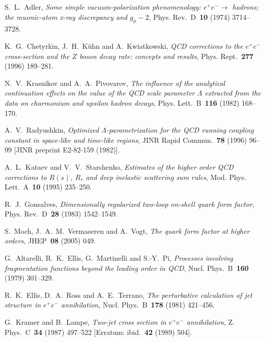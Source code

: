 S.~L.~Adler, \emph{Some simple vacuum-polarization phenomenology: $e^+e^-\to$ hadrons; the muonic-atom x-ray discrepancy and $g_\mu-2$}, Phys. Rev.~D~\textbf{10} (1974) \mbox{3714--3728}.

K.~G.~Chetyrkin, J.~H.~K\"uhn and A.~Kwiatkowski, \emph{QCD corrections to the $e^+e^-$ cross-section and the $Z$ boson decay rate: concepts and results}, Phys. Rept.~\textbf{277} (1996) \mbox{189--281}.

N.~V.~Krasnikov and A.~A.~Pivovarov, \emph{The influence of the analytical continuation effects on the value of the QCD scale parameter $\Lambda$ extracted from the data on charmonium and upsilon hadron decays}, Phys. Lett.~B~\textbf{116} (1982) \mbox{168--170}.

A.~V.~Radyushkin, \emph{Optimized $\Lambda$-parametrization for the QCD running coupling constant in space-like and time-like regions}, JINR Rapid Commun.~\textbf{78} (1996) \mbox{96--99} [JINR preprint E2-82-159 (1982)].

A.~L.~Kataev and V.~V.~Starshenko, \emph{Estimates of the higher order QCD corrections to $R(s)$, $R_\tau$ and deep inelastic scattering sum rules}, Mod. Phys. Lett.~A~\textbf{10} (1995) \mbox{235--250}.

R.~J.~Gonsalves, \emph{Dimensionally regularized two-loop on-shell quark form factor}, Phys. Rev.~D~\textbf{28} (1983) \mbox{1542--1549}.

S.~Moch, J.~A.~M.~Vermaseren and A.~Vogt, \emph{The quark form factor at higher orders}, JHEP~\textbf{08} (2005) \mbox{049}.

G.~Altarelli, R.~K.~Ellis, G.~Martinelli and S.-Y.~Pi, \emph{Processes involving fragmentation functions beyond the leading order in QCD}, Nucl. Phys.~B~\textbf{160} (1979) \mbox{301--329}.

R.~K.~Ellis, D.~A.~Ross and A.~E.~Terrano, \emph{The perturbative calculation of jet structure in $e^+e^-$ annihilation}, Nucl. Phys.~B~\textbf{178} (1981) \mbox{421--456}.

G.~Kramer and B.~Lampe, \emph{Two-jet cross section in $e^+e^-$ annihilation}, Z. Phys.~C~\textbf{34} (1987) \mbox{497--522} [Erratum: ibid.~\textbf{42} (1989) \mbox{504}].

